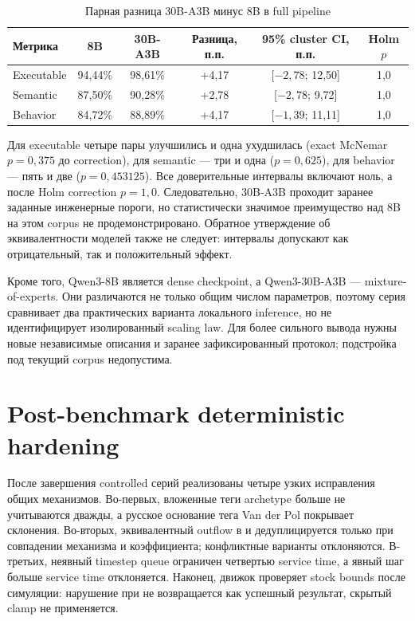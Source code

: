 \begin{table}[H]
    \centering
    \caption{Парная разница 30B-A3B минус 8B в full pipeline}
    \label{tab:local-model-comparison}
    \footnotesize
    \begin{tabular}{lccccc}
        \toprule
        Метрика & 8B & 30B-A3B & Разница, п.п. & 95\% cluster CI, п.п. & Holm $p$ \\
        \midrule
        Executable & 94,44\% & 98,61\% & +4,17 & [$-2,78$; 12,50] & 1,0 \\
        Semantic & 87,50\% & 90,28\% & +2,78 & [$-2,78$; 9,72] & 1,0 \\
        Behavior & 84,72\% & 88,89\% & +4,17 & [$-1,39$; 11,11] & 1,0 \\
        \bottomrule
    \end{tabular}
\end{table}

Для executable четыре пары улучшились и одна ухудшилась (exact McNemar $p=0{,}375$ до correction), для semantic --- три и одна ($p=0{,}625$), для behavior --- пять и две ($p=0{,}453125$). Все доверительные интервалы включают ноль, а после Holm correction $p=1{,}0$. Следовательно, 30B-A3B проходит заранее заданные инженерные пороги, но статистически значимое преимущество над 8B на этом corpus не продемонстрировано. Обратное утверждение об эквивалентности моделей также не следует: интервалы допускают как отрицательный, так и положительный эффект.

Кроме того, Qwen3-8B является dense checkpoint, а Qwen3-30B-A3B --- mixture-of-experts. Они различаются не только общим числом параметров, поэтому серия сравнивает два практических варианта локального inference, но не идентифицирует изолированный scaling law. Для более сильного вывода нужны новые независимые описания и заранее зафиксированный протокол; подстройка под текущий corpus недопустима.

\section{Post-benchmark deterministic hardening}

После завершения controlled серий реализованы четыре узких исправления общих механизмов. Во-первых, вложенные теги archetype больше не учитываются дважды, а русское основание тега Van der Pol покрывает склонения. Во-вторых, эквивалентный outflow в  и  дедуплицируется только при совпадении механизма и коэффициента; конфликтные варианты отклоняются. В-третьих, неявный timestep queue ограничен четвертью service time, а явный шаг больше service time отклоняется. Наконец, движок проверяет stock bounds после симуляции: нарушение при  не возвращается как успешный результат, скрытый clamp не применяется.

